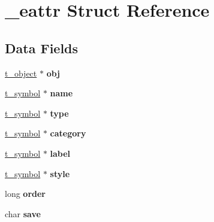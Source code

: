 \hypertarget{struct__eattr}{\section{\-\_\-eattr Struct Reference}
\label{struct__eattr}
}
\subsection*{Data Fields}
\begin{DoxyCompactItemize}
\item 
\hypertarget{struct__eattr_a064eb377293a7336941a89262bb4b70c}{\hyperlink{struct__text}{t\-\_\-object} $\ast$ {\bfseries obj}}\label{struct__eattr_a064eb377293a7336941a89262bb4b70c}

\item 
\hypertarget{struct__eattr_a6819488c01236bae4b115dcc15c27e95}{\hyperlink{struct__symbol}{t\-\_\-symbol} $\ast$ {\bfseries name}}\label{struct__eattr_a6819488c01236bae4b115dcc15c27e95}

\item 
\hypertarget{struct__eattr_a6e9f41f359f7588f11d1e2ab8c745599}{\hyperlink{struct__symbol}{t\-\_\-symbol} $\ast$ {\bfseries type}}\label{struct__eattr_a6e9f41f359f7588f11d1e2ab8c745599}

\item 
\hypertarget{struct__eattr_aa2c8c490a3fba46a31fbafcd739c63bc}{\hyperlink{struct__symbol}{t\-\_\-symbol} $\ast$ {\bfseries category}}\label{struct__eattr_aa2c8c490a3fba46a31fbafcd739c63bc}

\item 
\hypertarget{struct__eattr_a0e6a1d1c023e1e1ea182c7d1df964652}{\hyperlink{struct__symbol}{t\-\_\-symbol} $\ast$ {\bfseries label}}\label{struct__eattr_a0e6a1d1c023e1e1ea182c7d1df964652}

\item 
\hypertarget{struct__eattr_a3da6bc9b334bea21c7d24be105b852a6}{\hyperlink{struct__symbol}{t\-\_\-symbol} $\ast$ {\bfseries style}}\label{struct__eattr_a3da6bc9b334bea21c7d24be105b852a6}

\item 
\hypertarget{struct__eattr_a70328b614bd370f7e76d83b552e40d40}{long {\bfseries order}}\label{struct__eattr_a70328b614bd370f7e76d83b552e40d40}

\item 
\hypertarget{struct__eattr_ab22c2f8dadce0bba99b5f6563733e76c}{char {\bfseries save}}\label{struct__eattr_ab22c2f8dadce0bba99b5f6563733e76c}


\end{DoxyCompactItemize}
